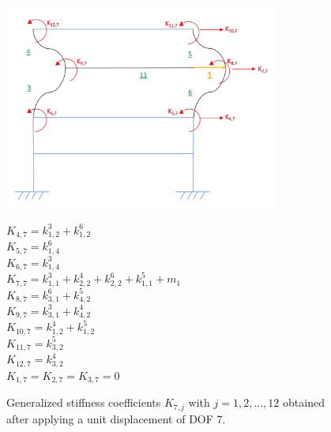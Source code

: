 \documentclass[11pt,a4paper,titlepage]{report}
\begin{document}
\begin{figure} [h]
\begin{minipage}{0.59\linewidth}
        \centering
         \includegraphics[width=9cm]{U=7.jpeg}
\end{minipage}
\begin{minipage}{0.4\linewidth}
\begin{small}
        $K_{4,7} = k^3_{1,2}+k^6_{1,2}$\\
        $K_{5,7} = k^6_{1,4}$\\
        $K_{6,7} = k^3_{1,4}$\\
        $K_{7,7} = k^3_{1,1}+k^4_{2,2}+k^6_{2,2}+k^5_{1,1}+m_1$\\
        $K_{8,7} = k^6_{3,1}+k^5_{4,2}$\\
        $K_{9,7} = k^3_{3,1}+k^4_{4,2}$\\
        $K_{10,7} = k^4_{1,2}+k^5_{1,2}$\\
        $K_{11,7} = k^5_{3,2}$\\
        $K_{12,7} = k^4_{3,2}$\\
        $K_{1,7} = K_{2,7} = K_{3,7} = 0$\\
\end{small}
\end{minipage}
\caption{Generalized stiffness coefficients $K_{7,j}$ with $j=1,2,...,12$ obtained after applying a unit displacement of DOF 7.}
\label{fig: I.1 - u7=1}
\end{figure}
\end{document}
